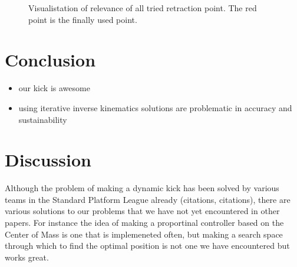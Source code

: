 \documentclass[a4paper]{article}
\begin{document}
\begin{figure}[htbp]
  \centering
  \caption{Visualistation of relevance of all tried retraction point. The red
      point is the finally used point.
         }
  \label{fig:retraction_plot1}
\end{figure}


\section{Conclusion}
\begin{itemize}
    \item our kick is awesome
    \item using iterative inverse kinematics solutions are problematic in
        accuracy and sustainability
\end{itemize}

\section{Discussion}
Although the problem of making a dynamic kick has been solved by various teams
in the Standard Platform League already (citations, citations), there are various solutions to our
problems that we have not yet encountered in other papers. For instance the idea
of making a proportinal controller based on the Center of Mass is one that is
implemeneted often, but making a search space through which to find the optimal
position is not one we have encountered but works great.
\end{document}
